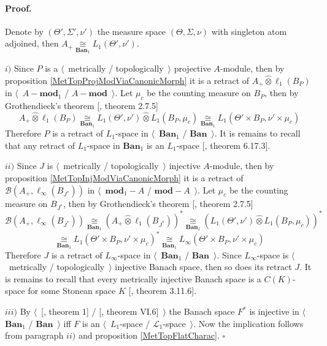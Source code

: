 \documentclass[12pt]{article}
\newcommand{\projtens}{\mathbin{\widehat{\otimes}}}
\newcommand{\isom}[1]{\mathop{\mathbin{\cong}}\limits_{#1}}
\renewenvironment{proof}{\paragraph{Proof.}}{\hfill$\square$\medskip}
\begin{document}
\begin{proof} 

Denote by $(\Theta',\Sigma',\nu')$ the measure space $(\Theta,\Sigma,\nu)$ with singleton atom adjoined, then $A_+\isom{\mathbf{Ban}_1} L_1(\Theta',\nu')$.

$i)$ Since $P$ is a $\langle$~metrically / topologically~$\rangle$ projective $A$-module, then by proposition \ref{MetTopProjModViaCanonicMorph} it is a retract of $A_+\projtens \ell_1(B_P)$ in $\langle$~$A-\mathbf{mod}_1$ / $A-\mathbf{mod}$~$\rangle$. Let $\mu_c$ be the counting measure on $B_P$, then by Grothendieck's theorem [\cite{HelLectAndExOnFuncAn}, theorem 2.7.5]
$$
A_+\projtens\ell_1(B_P)
\isom{\mathbf{Ban}_1}L_1(\Theta',\nu')\projtens L_1(B_P,\mu_c)
\isom{\mathbf{Ban}_1}L_1(\Theta'\times B_P,\nu'\times \mu_c)
$$
Therefore $P$ is a retract of $L_1$-space in $\langle$~$\mathbf{Ban}_1$ / $\mathbf{Ban}$~$\rangle$. It is remains to recall that any retract of $L_1$-space in $\mathbf{Ban}_1$ is an $L_1$-space [\cite{LaceyIsomThOfClassicBanSp}, theorem 6.17.3].

$ii)$ Since $J$ is $\langle$~metrically / topologically~$\rangle$ injective $A$-module, then by proposition \ref{MetTopInjModViaCanonicMorph} it is a retract of $\mathcal{B}(A_+,\ell_\infty(B_{J^*}))$ in $\langle$~$\mathbf{mod}_1-A$ / $\mathbf{mod}-A$~$\rangle$. Let $\mu_c$ be the counting measure on $B_{J^*}$, then by Grothendieck's theorem [\cite{HelLectAndExOnFuncAn}, theorem 2.7.5]
$$
\mathcal{B}(A_+,\ell_\infty(B_{J^*}))
\isom{\mathbf{Ban}_1}(A_+\projtens \ell_1(B_{J^*}))^*
\isom{\mathbf{Ban}_1}(L_1(\Theta',\nu')\projtens L_1(B_P,\mu_c))^*
$$
$$
\isom{\mathbf{Ban}_1}L_1(\Theta'\times B_P,\nu'\times \mu_c)^*
\isom{\mathbf{Ban}_1}L_\infty(\Theta'\times B_P,\nu'\times \mu_c)
$$
Therefore $J$ is a retract of $L_\infty$-space in $\langle$~$\mathbf{Ban}_1$ / $\mathbf{Ban}$~$\rangle$. Since $L_\infty$-space is $\langle$~metrically / topologically~$\rangle$ injective Banach space, then so does its retract $J$. It is remains to recall that every metrically injective Banach space is a $C(K)$-space for some Stonean space $K$ [\cite{LaceyIsomThOfClassicBanSp}, theorem 3.11.6].

$iii)$  By $\langle$~[\cite{GrothMetrProjFlatBanSp}, theorem 1] / [\cite{StegRethNucOpL1LInfSp}, theorem VI.6]~$\rangle$ the Banach space $F^*$ is injective in $\langle$~$\mathbf{Ban}_1$ / $\mathbf{Ban}$~$\rangle$ iff $F$ is an $\langle$~$L_1$-space / $\mathscr{L}_1$-space~$\rangle$. Now the implication follows from paragraph $ii)$ and proposition \ref{MetTopFlatCharac}.
\end{proof}
\end{document}

